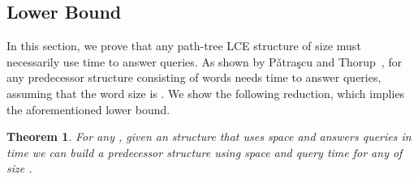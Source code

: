 \documentclass [10pt]{article}
\newtheorem{theorem}{Theorem}
\begin{document}
\subsection{Lower Bound}

In this section, we prove that any path-tree LCE structure of size  must necessarily
use  time to answer queries. 
As shown by P{\v{a}}tra{\c{s}}cu and Thorup~\cite{PT2006}, for  any predecessor structure consisting
of  words needs  time to answer queries, assuming that the word size is .
We show the following reduction, which implies the aforementioned lower bound.

\begin{theorem}
For any , given an  structure that uses  space and answers queries in  time we can build
a predecessor structure using  space and  query time for any  of
size .
\end{theorem}
\end{document}
